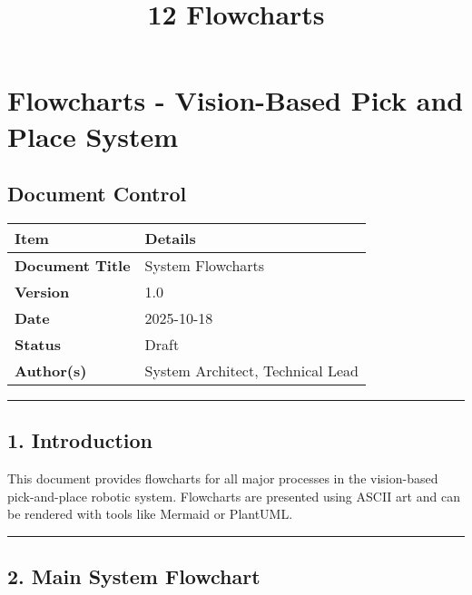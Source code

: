 \documentclass[
]{article}
\title{12 Flowcharts}
\author{}
\date{}
\begin{document}
\maketitle

{
\setcounter{tocdepth}{3}
\tableofcontents
}
\hypertarget{flowcharts---vision-based-pick-and-place-system}{%
\section{Flowcharts - Vision-Based Pick and Place
System}\label{flowcharts---vision-based-pick-and-place-system}}

\hypertarget{document-control}{%
\subsection{Document Control}\label{document-control}}

\begin{longtable}[]{@{}ll@{}}
\toprule\noalign{}
\textbf{Item} & \textbf{Details} \\
\midrule\noalign{}
\endhead
\bottomrule\noalign{}
\endlastfoot
\textbf{Document Title} & System Flowcharts \\
\textbf{Version} & 1.0 \\
\textbf{Date} & 2025-10-18 \\
\textbf{Status} & Draft \\
\textbf{Author(s)} & System Architect, Technical Lead \\
\end{longtable}

\begin{center}\rule{0.5\linewidth}{0.5pt}\end{center}

\hypertarget{introduction}{%
\subsection{1. Introduction}\label{introduction}}

This document provides flowcharts for all major processes in the
vision-based pick-and-place robotic system. Flowcharts are presented
using ASCII art and can be rendered with tools like Mermaid or PlantUML.

\begin{center}\rule{0.5\linewidth}{0.5pt}\end{center}

\hypertarget{main-system-flowchart}{%
\subsection{2. Main System Flowchart}\label{main-system-flowchart}}
\end{document}
